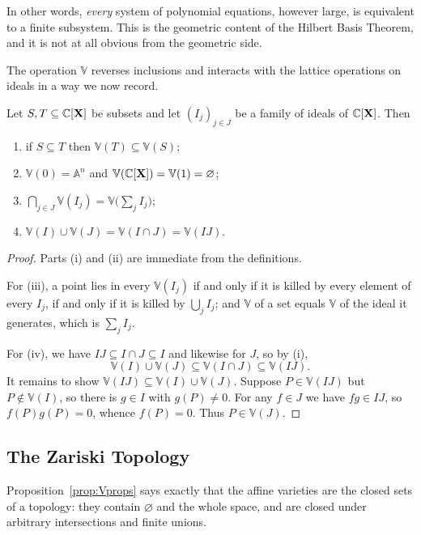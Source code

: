 \documentclass[a4paper]{scrartcl}
\newcommand{\A}{\mathbb{A}}
\newcommand{\V}{\mathbb{V}}
\begin{document}
In other words, \emph{every} system of polynomial equations, however large, is equivalent to a finite subsystem. This is the geometric content of the Hilbert Basis Theorem, and it is not at all obvious from the geometric side.

The operation $\V$ reverses inclusions and interacts with the lattice operations on ideals in a way we now record.

\begin{proposition}\label{prop:Vprops}
	Let $S, T \subseteq \mathbb{C}[\mathbf{X}]$ be subsets and let $(I_j)_{j \in J}$ be a family of ideals of $\mathbb{C}[\mathbf{X}]$. Then
	\begin{enumerate}[label=(\roman*)]
		\item if $S \subseteq T$ then $\V(T) \subseteq \V(S)$;
		\item $\V(0) = \A^n$ and $\V(\C[\mathbf{X}]) = \V(1) = \varnothing$;
		\item $\bigcap_{j \in J} \V(I_j) = \V\big(\sum_{j} I_j\big)$;
		\item $\V(I) \cup \V(J) = \V(I \cap J) = \V(IJ)$.
	\end{enumerate}
\end{proposition}

\begin{proof}
	Parts (i) and (ii) are immediate from the definitions.

	For (iii), a point lies in every $\V(I_j)$ if and only if it is killed by every element of every $I_j$, if and only if it is killed by $\bigcup_j I_j$; and $\V$ of a set equals $\V$ of the ideal it generates, which is $\sum_j I_j$.

	For (iv), we have $IJ \subseteq I \cap J \subseteq I$ and likewise for $J$, so by (i),
	$$\V(I) \cup \V(J) \subseteq \V(I\cap J) \subseteq \V(IJ).$$
	It remains to show $\V(IJ) \subseteq \V(I) \cup \V(J)$. Suppose $P \in \V(IJ)$ but $P \notin \V(I)$, so there is $g \in I$ with $g(P) \neq 0$. For any $f \in J$ we have $fg \in IJ$, so $f(P)g(P) = 0$, whence $f(P) = 0$. Thus $P \in \V(J)$.
\end{proof}

\subsection{The Zariski Topology}

Proposition~\ref{prop:Vprops} says exactly that the affine varieties are the closed sets of a topology: they contain $\varnothing$ and the whole space, and are closed under arbitrary intersections and finite unions.
\end{document}
